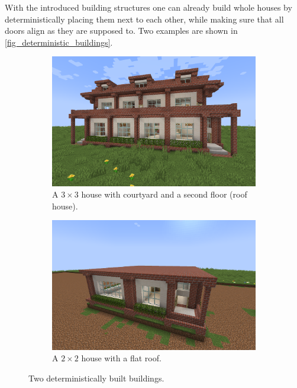 \documentclass[
oneside,
fontsize=11pt
]{scrartcl}
\begin{document}
With the introduced building structures one can already 
build whole houses by deterministically placing them next to each other, 
while making sure that all doors align as they are supposed to. 
Two examples are shown in \autoref{fig_deterministic_buildings}.

\begin{figure}[ht]
  \centering
  \begin{subfigure}[t]{0.48\textwidth}
    \includegraphics[width=\textwidth]{images/buildings/deterministic-building-with-roofhouse.png}
    \caption{A $3 \times 3$ house with courtyard and a second floor (roof house).}
  \end{subfigure}
  \hfill
  \begin{subfigure}[t]{0.48\textwidth}
      \includegraphics[width=\textwidth]{images/buildings/deterministic-building-with-flat-roof.png}
      \caption{A $2 \times 2$ house with a flat roof.}
  \end{subfigure}
  \caption{Two deterministically built buildings.}
  \label{fig_deterministic_buildings}
\end{figure}
\end{document}
